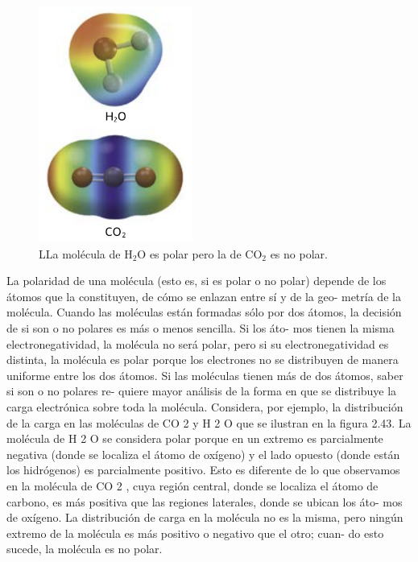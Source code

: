 \documentclass[12pt,addpoints,answers]{guia}
\begin{document}
\begin{tcolorbox}
\begin{figure}[H]
        \includegraphics[width=0.45\textwidth]{../images/20230321055646}
        \caption{LLa molécula de H$_2$O es polar pero la de CO$_2$ es no polar.}
        \label{fig:20230321055646}
    \end{figure}
    La polaridad de una molécula (esto es, si es polar o no polar) depende
    de los átomos que la constituyen, de cómo se enlazan entre sí y de la geo-
    metría de la molécula. Cuando las moléculas están formadas sólo por dos
    átomos, la decisión de si son o no polares es más o menos sencilla. Si los áto-
    mos tienen la misma electronegatividad, la molécula no será polar, pero si
    su electronegatividad es distinta, la molécula es polar porque los electrones
    no se distribuyen de manera uniforme entre los dos átomos.
    Si las moléculas tienen más de dos átomos, saber si son o no polares re-
    quiere mayor análisis de la forma en que se distribuye la carga electrónica
    sobre toda la molécula. Considera, por ejemplo, la distribución de la carga
    en las moléculas de CO 2 y H 2 O que se ilustran en la figura 2.43. La molécula
    de H 2 O se considera polar porque en un extremo es parcialmente negativa
    (donde se localiza el átomo de oxígeno) y el lado opuesto (donde están los
    hidrógenos) es parcialmente positivo. Esto es diferente de lo que observamos
    en la molécula de CO 2 , cuya región central, donde se localiza el átomo de
    carbono, es más positiva que las regiones laterales, donde se ubican los áto-
    mos de oxígeno. La distribución de carga en la molécula no es la misma, pero
    ningún extremo de la molécula es más positivo o negativo que el otro; cuan-
    do esto sucede, la molécula es no polar.
\end{tcolorbox}
\end{document}
